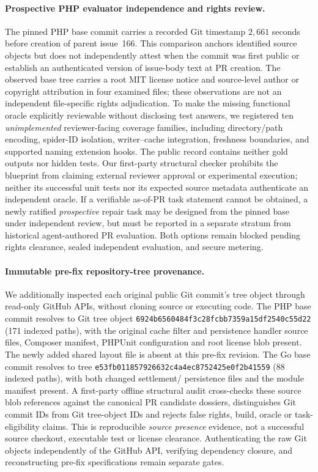 \documentclass[pdflatex,sn-basic]{sn-jnl}
\begin{document}
\paragraph{Prospective PHP evaluator independence and rights review.}
The pinned PHP base commit carries a recorded Git
timestamp $2{,}661$ seconds before creation of parent
issue~166. This comparison anchors identified source
objects but does not independently attest when the
commit was first public or establish an authenticated
version of issue-body text at PR creation. The observed base tree carries
a root MIT license notice and source-level author or
copyright attribution in four examined files; these
observations are not an independent file-specific rights
adjudication. To make the missing functional oracle
explicitly reviewable without disclosing test answers,
we registered ten \emph{unimplemented} reviewer-facing
coverage families, including directory/path encoding,
spider-ID isolation, writer--cache integration, freshness
boundaries, and supported naming extension hooks.
The public record contains neither gold outputs nor
hidden tests. Our first-party structural checker prohibits
the blueprint from claiming external reviewer approval
or experimental execution; neither its successful unit
tests nor its expected source metadata authenticate an
independent oracle. If a verifiable as-of-PR task statement
cannot be obtained, a newly ratified \emph{prospective}
repair task may be designed from the pinned base under
independent review, but must be reported in a separate
stratum from historical agent-authored PR evaluation.
Both options remain blocked pending rights clearance,
sealed independent evaluation, and secure metering.

\paragraph{Immutable pre-fix repository-tree provenance.}
We additionally inspected each original public Git
commit's tree object through read-only GitHub APIs,
without cloning source or executing code. The
PHP base commit resolves to Git tree object
\texttt{6924b6560484f3c28fcbb7359a15df2540c55d22}
(171 indexed paths), with the original cache filter
and persistence handler source files, Composer
manifest, PHPUnit configuration and root license
blob present. The newly added shared layout file
is absent at this pre-fix revision. The Go base
commit resolves to tree
\texttt{e53fb011857926632c4a4ec8752425e0f2b41559}
(88 indexed paths), with both changed settlement/
persistence files and the module manifest present.
A first-party offline structural audit cross-checks
these source blob references against the canonical
PR candidate dossiers, distinguishes Git commit
IDs from Git tree-object IDs and rejects false
rights, build, oracle or task-eligibility claims.
This is reproducible \emph{source presence} evidence,
not a successful source checkout, executable test
or license clearance. Authenticating the raw Git
objects independently of the GitHub API, verifying
dependency closure, and reconstructing pre-fix
specifications remain separate gates.
\end{document}

